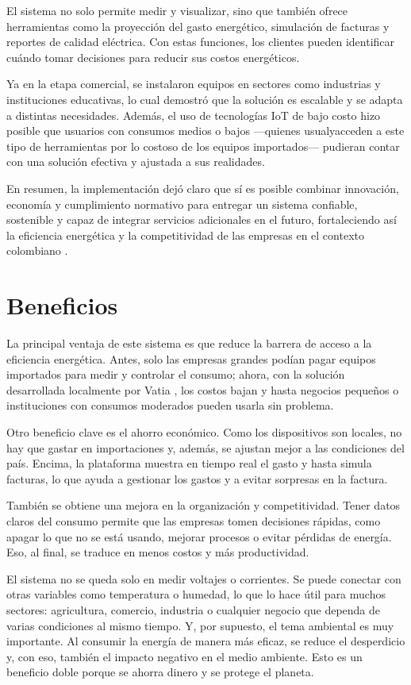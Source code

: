 El sistema no solo permite medir y visualizar, sino que también ofrece herramientas como la proyección del gasto energético, simulación de facturas y reportes de calidad eléctrica. Con estas funciones, los clientes pueden identificar cuándo tomar decisiones para reducir sus costos energéticos.

Ya en la etapa comercial, se instalaron equipos en sectores como industrias y instituciones educativas, lo cual demostró que la solución es escalable y se adapta a distintas necesidades. Además, el uso de tecnologías IoT de bajo costo hizo posible que usuarios con consumos medios o bajos —quienes usualyacceden a este tipo de herramientas por lo costoso de los equipos importados— pudieran contar con una solución efectiva y ajustada a sus realidades.

En resumen, la implementación dejó claro que sí es posible combinar innovación, economía y cumplimiento normativo para entregar un sistema confiable, sostenible y capaz de integrar servicios adicionales en el futuro, fortaleciendo así la eficiencia energética y la competitividad de las empresas en el contexto colombiano \cite{Jaramillo2022}.

\section{Beneficios}
La principal ventaja de este sistema es que reduce la barrera de acceso a la eficiencia energética. Antes, solo las empresas grandes podían pagar equipos importados para medir y controlar el consumo; ahora, con la solución desarrollada localmente por Vatia \cite{Jaramillo2022}, los costos bajan y hasta negocios pequeños o instituciones con consumos moderados pueden usarla sin problema.

Otro beneficio clave es el ahorro económico. Como los dispositivos son locales, no hay que gastar en importaciones y, además, se ajustan mejor a las condiciones del país. Encima, la plataforma muestra en tiempo real el gasto y hasta simula facturas, lo que ayuda a gestionar los gastos y a evitar sorpresas en la factura.

También se obtiene una mejora en la organización y competitividad. Tener datos claros del consumo permite que las empresas tomen decisiones rápidas, como apagar lo que no se está usando, mejorar procesos o evitar pérdidas de energía. Eso, al final, se traduce en menos costos y más productividad.

El sistema no se queda solo en medir voltajes o corrientes. Se puede conectar con otras variables como temperatura o humedad, lo que lo hace útil para muchos sectores: agricultura, comercio, industria o cualquier negocio que dependa de varias condiciones al mismo tiempo. Y, por supuesto, el tema ambiental es muy importante. Al consumir la energía de manera más eficaz, se reduce el desperdicio y, con eso, también el impacto negativo en el medio ambiente. Esto es un beneficio doble porque se ahorra dinero y se protege el planeta.

